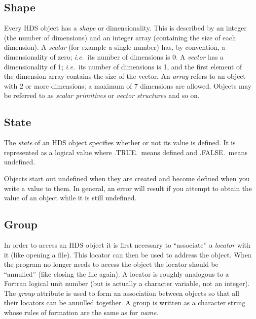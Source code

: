 \documentclass[twoside,11pt]{article}
\newcommand{\htmlref}[2]{#1}
\renewcommand{\_}{\texttt{\symbol{95}}}
\newcommand{\qt}[1]{``#1''}
\newcommand{\st}[1]{{\em{#1}}}
\newcommand{\qt}[1]{{\tt{"}}#1{\tt{"}}}
\begin{document}
\subsection{\label{sect:shape}Shape}

Every HDS object has a \st{shape} or dimensionality. This is
described by an integer (the number of dimensions) and an integer
array (containing the size of each dimension). A \st{scalar} (for
example a single number) has, by convention, a dimensionality of zero;
\st{i.e.}\ its number of dimensions is 0. A \st{vector} has a
dimensionality of 1; \st{i.e.}\ its number of dimensions is 1, and
the first element of the dimension array contains the size of the
vector.  An \st{array} refers to an object with 2 or more dimensions;
a maximum of 7 dimensions are allowed. Objects may be referred to as
\st{scalar primitives} or \st{vector structures} and so on.

\subsection{State}

The \st{state} of an HDS object specifies whether or not its value is
defined. It is represented as a logical value where .TRUE.\ means
defined and .FALSE.\ means undefined.

Objects start out undefined when they are created and become defined
when you write a value to them. In general, an error will result if
you attempt to obtain the value of an object while it is still
undefined.

\subsection{\label{sect:group}Group}

In order to access an HDS object it is first necessary to
\qt{associate} a \htmlref{\st{locator}}{sect:locators} with it (like
opening a file). This locator can then be used to address the
object. When the program no longer needs to access the object the
locator should be \htmlref{\qt{annulled}}{sect:annul} (like closing
the file again). A locator is roughly analogous to a Fortran logical
unit number (but is actually a character variable, not an
integer). The \st{group} attribute is used to form an association
between objects so that all their locators can be annulled together. A
group is written as a character string whose rules of formation are
the same as for \htmlref{\st{name}}{sect:name}.
\end{document}
